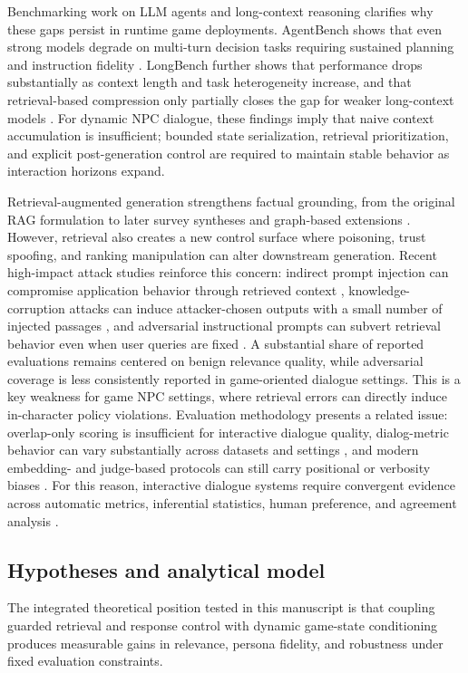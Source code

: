 ﻿\documentclass[a4paper,12pt]{article}
\begin{document}
Benchmarking work on LLM agents and long-context reasoning clarifies why these gaps persist in runtime game deployments. AgentBench shows that even strong models degrade on multi-turn decision tasks requiring sustained planning and instruction fidelity \cite{Liu2023AgentBench}. LongBench further shows that performance drops substantially as context length and task heterogeneity increase, and that retrieval-based compression only partially closes the gap for weaker long-context models \cite{Bai2024LongBench}. For dynamic NPC dialogue, these findings imply that naive context accumulation is insufficient; bounded state serialization, retrieval prioritization, and explicit post-generation control are required to maintain stable behavior as interaction horizons expand.

Retrieval-augmented generation strengthens factual grounding, from the original RAG formulation to later survey syntheses and graph-based extensions \cite{Lewis2020RAG,Fan2024RAGSurvey,Edge2024GraphRAG}. However, retrieval also creates a new control surface where poisoning, trust spoofing, and ranking manipulation can alter downstream generation. Recent high-impact attack studies reinforce this concern: indirect prompt injection can compromise application behavior through retrieved context \cite{Greshake2023PromptInjection}, knowledge-corruption attacks can induce attacker-chosen outputs with a small number of injected passages \cite{Zou2025PoisonedRAG}, and adversarial instructional prompts can subvert retrieval behavior even when user queries are fixed \cite{Chaturvedi2025AIP}. A substantial share of reported evaluations remains centered on benign relevance quality, while adversarial coverage is less consistently reported in game-oriented dialogue settings. This is a key weakness for game NPC settings, where retrieval errors can directly induce in-character policy violations. Evaluation methodology presents a related issue: overlap-only scoring is insufficient for interactive dialogue quality, dialog-metric behavior can vary substantially across datasets and settings \cite{Yeh2021DialogMetrics}, and modern embedding- and judge-based protocols can still carry positional or verbosity biases \cite{Zhang2020BERTScore,Zheng2023MTBench,Wang2024Judge,Dubois2024AlpacaEval}. For this reason, interactive dialogue systems require convergent evidence across automatic metrics, inferential statistics, human preference, and agreement analysis \cite{Cohen1960Kappa}.

\subsection{Hypotheses and analytical model}
The integrated theoretical position tested in this manuscript is that coupling guarded retrieval and response control with dynamic game-state conditioning produces measurable gains in relevance, persona fidelity, and robustness under fixed evaluation constraints.
\end{document}
